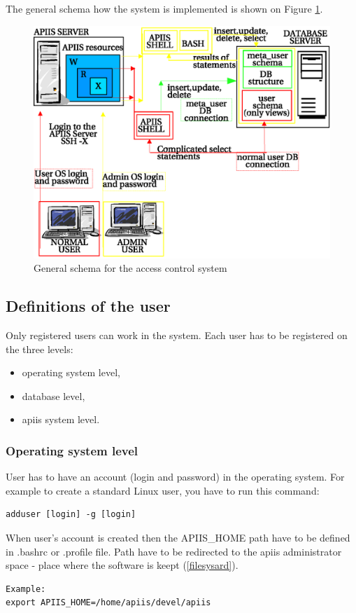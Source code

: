 The general schema how the system is implemented is shown on Figure \ref{fig:generalschema}.
\begin{figure}[h]
\begin{center}
   \includegraphics[scale=1]{./access-control/generalschema.eps}
   \caption{General schema for the access control system}
   \label{fig:generalschema}
\end{center}
\end{figure}

\subsection{Definitions of the user \label{userd}}
Only registered users can work in the system. Each user has to be registered on the three levels: 
\begin{itemize}
\item operating system level,
\item database level, 
\item apiis system level.
\end{itemize} 
\subsubsection{Operating system level}
User has to have an account (login and password) in the operating system. For example to create a standard Linux user, you have to run this command:
\begin{verbatim}
adduser [login] -g [login]
\end{verbatim} 
When user's account is created then the APIIS\_HOME path have to be defined in .bashrc or .profile file. Path have to be redirected to the apiis administrator space - place where the software is keept (\ref{filesysard}).
\begin{verbatim}
Example:
export APIIS_HOME=/home/apiis/devel/apiis
\end{verbatim} 
